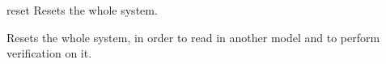 \begin{nusmvCommand} {reset} {Resets the whole system.}


Resets the whole system, in order to read in another model and to
perform verification on it.

\end{nusmvCommand}
